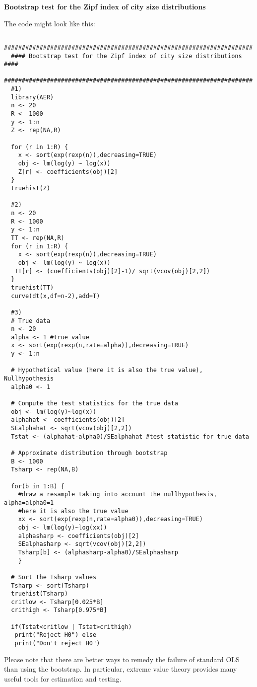 \begin{Solution}{16.8}
\textbf{Bootstrap test for the Zipf index of city size distributions}

The code might look like this:
\begin{verbatim}
  ######################################################################
  #### Bootstrap test for the Zipf index of city size distributions ####
  ######################################################################
  #1)
  library(AER)
  n <- 20
  R <- 1000
  y <- 1:n
  Z <- rep(NA,R)

  for (r in 1:R) {
    x <- sort(exp(rexp(n)),decreasing=TRUE)
    obj <- lm(log(y) ~ log(x))
    Z[r] <- coefficients(obj)[2]
  }
  truehist(Z)

  #2)
  n <- 20
  R <- 1000
  y <- 1:n
  TT <- rep(NA,R)
  for (r in 1:R) {
    x <- sort(exp(rexp(n)),decreasing=TRUE)
    obj <- lm(log(y) ~ log(x))
   TT[r] <- (coefficients(obj)[2]-1)/ sqrt(vcov(obj)[2,2])
  }
  truehist(TT)
  curve(dt(x,df=n-2),add=T)

  #3)
  # True data
  n <- 20
  alpha <- 1 #true value
  x <- sort(exp(rexp(n,rate=alpha)),decreasing=TRUE)
  y <- 1:n

  # Hypothetical value (here it is also the true value), Nullhypothesis
  alpha0 <- 1

  # Compute the test statistics for the true data
  obj <- lm(log(y)~log(x))
  alphahat <- coefficients(obj)[2]
  SEalphahat <- sqrt(vcov(obj)[2,2])
  Tstat <- (alphahat-alpha0)/SEalphahat #test statistic for true data

  # Approximate distribution through bootstrap
  B <- 1000
  Tsharp <- rep(NA,B)

  for(b in 1:B) {
    #draw a resample taking into account the nullhypothesis, alpha=alpha0=1
    #here it is also the true value
    xx <- sort(exp(rexp(n,rate=alpha0)),decreasing=TRUE)
    obj <- lm(log(y)~log(xx))
    alphasharp <- coefficients(obj)[2]
    SEalphasharp <- sqrt(vcov(obj)[2,2])
    Tsharp[b] <- (alphasharp-alpha0)/SEalphasharp
    }

  # Sort the Tsharp values
  Tsharp <- sort(Tsharp)
  truehist(Tsharp)
  critlow <- Tsharp[0.025*B]
  crithigh <- Tsharp[0.975*B]

  if(Tstat<critlow | Tstat>crithigh)
   print("Reject H0") else
   print("Don't reject H0")
\end{verbatim}

Please note that there are better ways to remedy the failure of standard OLS than using the bootstrap. In particular, extreme value theory provides many useful tools for estimation and testing.
\end{Solution}

